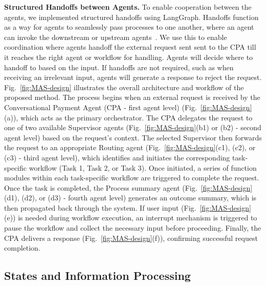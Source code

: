 \documentclass[runningheads]{llncs}
\begin{document}
\noindent\textbf{Structured Handoffs between Agents.}
To enable cooperation between the agents, we implemented structured handoffs using LangGraph. Handoffs function as a way for agents to seamlessly pass processes to one another, where an agent can invoke the downstream or upstream agents~\cite{langchain2024langgraph}. We use this to enable coordination where agents handoff the external request sent sent to the CPA till it reaches the right agent or workflow for handling. Agents will decide where to handoff to based on the input. If handoffs are not required, such as when receiving an irrelevant input, agents will generate a response to reject the request.\\

Fig.~\ref{fig:MAS-design} illustrates the overall architecture and workflow of the proposed method. The process begins when an external request is received by the Conversational Payment Agent (CPA - first agent level) (Fig.~\ref{fig:MAS-design}(a)), which acts as the primary orchestrator. 
The CPA delegates the request to one of two available Supervisor agents (Fig.~\ref{fig:MAS-design}(b1) or (b2) - second agent level) based on the request's context. 
The selected Supervisor then forwards the request to an appropriate Routing agent (Fig.~\ref{fig:MAS-design}(c1), (c2), or (c3) - third agent level), which identifies and initiates the corresponding task-specific workflow (Task 1, Task 2, or Task 3). 
Once initiated, a series of function modules within each task-specific workflow are triggered to complete the request.
Once the task is completed, the Process summary agent (Fig.~\ref{fig:MAS-design}(d1), (d2), or (d3) - fourth agent level) generates an outcome summary, which is then propagated back through the system. 
If user input (Fig.~\ref{fig:MAS-design}(e)) is needed during workflow execution, an interrupt mechanism is triggered to pause the workflow and collect the necessary input before proceeding. 
Finally, the CPA delivers a response (Fig.~\ref{fig:MAS-design}(f)), confirming successful request completion. 

\subsection{States and Information Processing}
\end{document}
